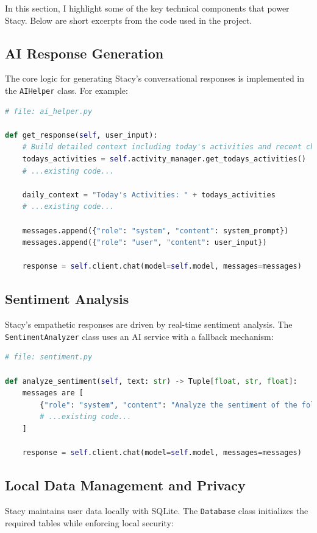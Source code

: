 \documentclass[12pt]{article}
\begin{document}
In this section, I highlight some of the key technical components that power Stacy. Below are short excerpts from the code used in the project.

\subsection{AI Response Generation}
The core logic for generating Stacy's conversational responses is implemented in the \texttt{AIHelper} class. For example:

\begin{lstlisting}[language=Python, caption=AI Response Handler, label=lst:ai_helper]
# file: ai_helper.py

def get_response(self, user_input):
    # Build detailed context including today's activities and recent chats
    todays_activities = self.activity_manager.get_todays_activities()
    # ...existing code...
    
    daily_context = "Today's Activities: " + todays_activities
    # ...existing code...
    
    messages.append({"role": "system", "content": system_prompt})
    messages.append({"role": "user", "content": user_input})
    
    response = self.client.chat(model=self.model, messages=messages)
\end{lstlisting}

\subsection{Sentiment Analysis}
Stacy's empathetic responses are driven by real-time sentiment analysis. The \texttt{SentimentAnalyzer} class uses an AI service with a fallback mechanism:

\begin{lstlisting}[language=Python, caption=Sentiment Analysis, label=lst:sentiment]
# file: sentiment.py

def analyze_sentiment(self, text: str) -> Tuple[float, str, float]:
    messages are [
        {"role": "system", "content": "Analyze the sentiment of the following text."},
        # ...existing code...
    ]
    
    response = self.client.chat(model=self.model, messages=messages)
\end{lstlisting}

\subsection{Local Data Management and Privacy}
Stacy maintains user data locally with SQLite. The \texttt{Database} class initializes the required tables while enforcing local security:
\end{document}
